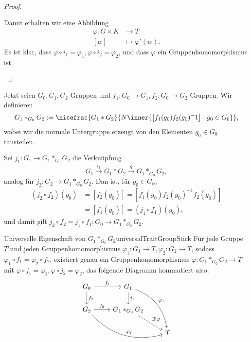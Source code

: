 \documentclass[language=ngerman]{TemplateLecture} %
\begin{document}
\begin{proof}
\begin{description}
        Damit erhalten wir eine Abbildung 
        \begin{equation*}
            \begin{split}
                \varphi: G \times K &\to T \\ [w] &\mapsto \varphi'(w).
            \end{split}
        \end{equation*}
        Es ist klar, dass $\varphi \circ i_1 = \varphi_1, \varphi \circ i_2 = \varphi_2$, und dass $\varphi$ ein Gruppenhomomorphismus ist.
    \end{description}
\end{proof}

Jetzt seien $G_0, G_1, G_2$ Gruppen und $f_1: G_0 \to G_1, f_2: G_0 \to G_2$ Gruppen. Wir definieren 
\begin{equation*}
    G_1 *_{G_0} G_2 := \nicefrac{G_1 * G_2}{N \inner{\left[f_1(g_0) f_2(g_0)^-1\right] \mid g_0 \in G_0}},
\end{equation*}
wobei wir die normale Untergruppe erzeugt von den Elementen $g_0 \in G_0$ rausteilen.

Sei $j_1: G_1 \to G_1 *_{G_0} G_2$ die Verknüpfung 
\begin{equation*}
    G_1 \overset{i_1}{\longrightarrow} G_1 * G_2 \overset{q}{\longrightarrow} G_1 *_{G_0} G_2,
\end{equation*}
analog für $j_2: G_2 \to G_1 *_{G_0} G_2$. Dan ist, für $g_0 \in G_0$,
\begin{equation*}
    \begin{split}
        (j_2 \circ f_2)(g_0) &= [f_2(g_0)] = [f_1(g_0) f_2(g_0)^{-1} f_2(g_0)] \\
        &= [f_1(g_0)] = (j_1 \circ f_1)(g_0),
    \end{split}
\end{equation*}
und damit gilt $j_2 \circ f_2 = j_1 \circ f_1: G_0 \to G_1 *_{G_0} G_2$.

\begin{lem}{Universelle Eigenschaft von $G_1 *_{G_0} G_2$}{universalTraitGroupStick}
    Für jede Gruppe $T$ und jeden Gruppenhomomorphismus $\varphi_1: G_1 \to T, \varphi_2: G_2 \to T$, sodass $\varphi_1 \circ f_1 = \varphi_2 \circ f_2$, existiert genau ein Gruppenhomomorphismus $\varphi: G_1 *_{G_0} G_2 \to T$ mit $\varphi \circ j_1 = \varphi_1, \varphi \circ j_2 = \varphi_2$, das folgende Diagramm kommutiert also:
    \begin{equation*}
        \begin{tikzcd}
            G_0 \arrow[r, "f_1"] \arrow[d, "f_2"] & G_1 \arrow[d, "j_1"] \arrow[ddr, bend left, "\varphi_1"] \\ 
            G_2 \arrow[r, "j_2"] \arrow[drr, bend right, "\varphi_2"] & G_1 *_{G_0} G_2 \arrow[dr, dashed, "\exists! \varphi"] \\
            & & T
        \end{tikzcd}
    \end{equation*}
\end{lem}
\end{document}
